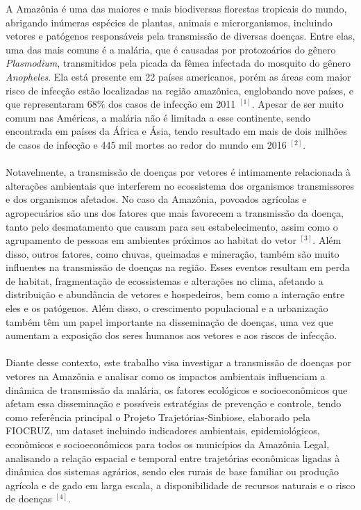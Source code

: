 \documentclass[12pt]{article}
\begin{document}
A Amazônia é uma das maiores e mais biodiversas florestas tropicais do mundo, abrigando inúmeras espécies de plantas, animais e microrganismos, incluindo vetores e patógenos responsáveis pela transmissão de diversas doenças. Entre elas, uma das mais comuns é a malária, que é causadas por protozoários do gênero \textit{Plasmodium}, transmitidos pela picada da fêmea infectada do mosquito do gênero \textit{Anopheles}. Ela está presente em 22 países americanos, porém as áreas com maior risco de infecção estão localizadas na região amazônica, englobando nove países, e que representaram $68\%$ dos casos de infecção em 2011 $^{[1]}$. Apesar de ser muito comum nas Américas, a malária não é limitada a esse continente, sendo encontrada em países da África e Ásia, tendo resultado em mais de dois milhões de casos de infecção e  445 mil mortes ao redor do mundo em 2016 $^{[2]}$.    
\\\\
Notavelmente, a transmissão de doenças por vetores é intimamente relacionada à alterações ambientais que interferem no ecossistema dos organismos transmissores e dos organismos afetados. No caso da Amazônia, povoados agrícolas e agropecuários são uns dos fatores que mais favorecem a transmissão da doença, tanto pelo desmatamento que causam para seu estabelecimento, assim como o agrupamento de pessoas em ambientes próximos ao habitat do vetor $^{[3]}$. Além disso, outros fatores, como chuvas, queimadas e mineração, também são muito influentes na transmissão de doenças na região. Esses eventos resultam em perda de habitat, fragmentação de ecossistemas e alterações no clima, afetando a distribuição e abundância de vetores e hospedeiros, bem como a interação entre eles e os patógenos. Além disso, o crescimento populacional e a urbanização também têm um papel importante na disseminação de doenças, uma vez que aumentam a exposição dos seres humanos aos vetores e aos riscos de infecção.
\\\\
Diante desse contexto, este trabalho visa investigar a transmissão de doenças por vetores na Amazônia e analisar como os impactos ambientais influenciam a dinâmica de transmissão da malária, os fatores ecológicos e socioeconômicos que afetam essa disseminação e possíveis estratégias de prevenção e controle, tendo como referência principal o Projeto Trajetórias-Sinbiose, elaborado pela FIOCRUZ, um dataset incluindo indicadores ambientais, epidemiológicos, econômicos e socioeconômicos para todos os municípios da Amazônia Legal, analisando a relação espacial e temporal entre trajetórias econômicas ligadas à dinâmica dos sistemas agrários, sendo eles rurais de base familiar ou produção agrícola e de gado em larga escala, a disponibilidade de recursos naturais e o risco de doenças $^{[4]}$.
\end{document}
